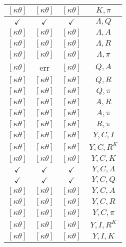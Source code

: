 \documentclass[a4paper,10pt]{article}
\begin{document}
\begin{longtable}{|c|c|c|c|}
\hline
$[\kappa \theta ]$ & $[\kappa \theta ]$ & $[\kappa \theta ]$ & ${K},{\pi}$ \\
\hline
$\checkmark$ & $\checkmark$ & $\checkmark$ & ${\Lambda},{Q}$ \\
\hline
$[\kappa \theta ]$ & $[\kappa \theta ]$ & $[\kappa \theta ]$ & ${\Lambda},{A}$ \\
\hline
$[\kappa \theta ]$ & $[\kappa \theta ]$ & $[\kappa \theta ]$ & ${\Lambda},{R}$ \\
\hline
$[\kappa \theta ]$ & $[\kappa \theta ]$ & $[\kappa \theta ]$ & ${\Lambda},{\pi}$ \\
\hline
$[\kappa \theta ]$ & err & $[\kappa \theta ]$ & ${Q},{A}$ \\
\hline
$[\kappa \theta ]$ & $[\kappa \theta ]$ & $[\kappa \theta ]$ & ${Q},{R}$ \\
\hline
$[\kappa \theta ]$ & $[\kappa \theta ]$ & $[\kappa \theta ]$ & ${Q},{\pi}$ \\
\hline
$[\kappa \theta ]$ & $[\kappa \theta ]$ & $[\kappa \theta ]$ & ${A},{R}$ \\
\hline
$[\kappa \theta ]$ & $[\kappa \theta ]$ & $[\kappa \theta ]$ & ${A},{\pi}$ \\
\hline
$[\kappa \theta ]$ & $[\kappa \theta ]$ & $[\kappa \theta ]$ & ${R},{\pi}$ \\
\hline
$[\kappa \theta ]$ & $[\kappa \theta ]$ & $[\kappa \theta ]$ & ${Y},{C},{I}$ \\
\hline
$[\kappa \theta ]$ & $[\kappa \theta ]$ & $[\kappa \theta ]$ & ${Y},{C},{R^{K}}$ \\
\hline
$[\kappa \theta ]$ & $[\kappa \theta ]$ & $[\kappa \theta ]$ & ${Y},{C},{K}$ \\
\hline
$\checkmark$ & $\checkmark$ & $\checkmark$ & ${Y},{C},{\Lambda}$ \\
\hline
$\checkmark$ & $\checkmark$ & $\checkmark$ & ${Y},{C},{Q}$ \\
\hline
$[\kappa \theta ]$ & $[\kappa \theta ]$ & $[\kappa \theta ]$ & ${Y},{C},{A}$ \\
\hline
$[\kappa \theta ]$ & $[\kappa \theta ]$ & $[\kappa \theta ]$ & ${Y},{C},{R}$ \\
\hline
$[\kappa \theta ]$ & $[\kappa \theta ]$ & $[\kappa \theta ]$ & ${Y},{C},{\pi}$ \\
\hline
$[\kappa \theta ]$ & $[\kappa \theta ]$ & $[\kappa \theta ]$ & ${Y},{I},{R^{K}}$ \\
\hline
$[\kappa \theta ]$ & $[\kappa \theta ]$ & $[\kappa \theta ]$ & ${Y},{I},{K}$ \\

\end{longtable}
\end{document}
